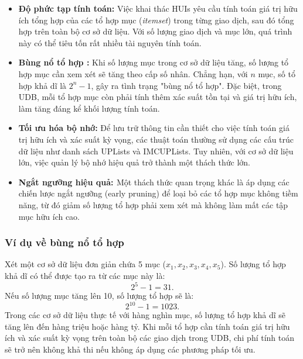 \documentclass[conference]{IEEEtran}
\begin{document}
\begin{itemize}
    \item \textbf{Độ phức tạp tính toán:} Việc khai thác HUIs yêu cầu tính toán giá trị hữu ích tổng hợp của các tổ hợp mục (\textit{itemset}) trong từng giao dịch, sau đó tổng hợp trên toàn bộ cơ sở dữ liệu. Với số lượng giao dịch và mục lớn, quá trình này có thể tiêu tốn rất nhiều tài nguyên tính toán.

    \item \textbf{Bùng nổ tổ hợp \cite{Combinatorial explosion}:} Khi số lượng mục trong cơ sở dữ liệu tăng, số lượng tổ hợp mục cần xem xét sẽ tăng theo cấp số nhân. Chẳng hạn, với \(n\) mục, số tổ hợp khả dĩ là \(2^n - 1\), gây ra tình trạng "bùng nổ tổ hợp". Đặc biệt, trong UDB, mỗi tổ hợp mục còn phải tính thêm xác suất tồn tại và giá trị hữu ích, làm tăng đáng kể khối lượng tính toán.

    \item \textbf{Tối ưu hóa bộ nhớ:} Để lưu trữ thông tin cần thiết cho việc tính toán giá trị hữu ích và xác suất kỳ vọng, các thuật toán thường sử dụng các cấu trúc dữ liệu như danh sách UPLists và IMCUPLists. Tuy nhiên, với cơ sở dữ liệu lớn, việc quản lý bộ nhớ hiệu quả trở thành một thách thức lớn.

    \item \textbf{Ngắt ngưỡng hiệu quả: \cite{Early stopping}} Một thách thức quan trọng khác là áp dụng các chiến lược ngắt ngưỡng (early pruning) để loại bỏ các tổ hợp mục không tiềm năng, từ đó giảm số lượng tổ hợp phải xem xét mà không làm mất các tập mục hữu ích cao.
\end{itemize}

\subsubsection{Ví dụ về bùng nổ tổ hợp}
Xét một cơ sở dữ liệu đơn giản chứa 5 mục (\(x_1, x_2, x_3, x_4, x_5\)). Số lượng tổ hợp khả dĩ có thể được tạo ra từ các mục này là:
\[
2^5 - 1 = 31.
\]
Nếu số lượng mục tăng lên 10, số lượng tổ hợp sẽ là:
\[
2^{10} - 1 = 1023.
\]
Trong các cơ sở dữ liệu thực tế với hàng nghìn mục, số lượng tổ hợp khả dĩ sẽ tăng lên đến hàng triệu hoặc hàng tỷ. Khi mỗi tổ hợp cần tính toán giá trị hữu ích và xác suất kỳ vọng trên toàn bộ các giao dịch trong UDB, chi phí tính toán sẽ trở nên không khả thi nếu không áp dụng các phương pháp tối ưu.
\end{document}
